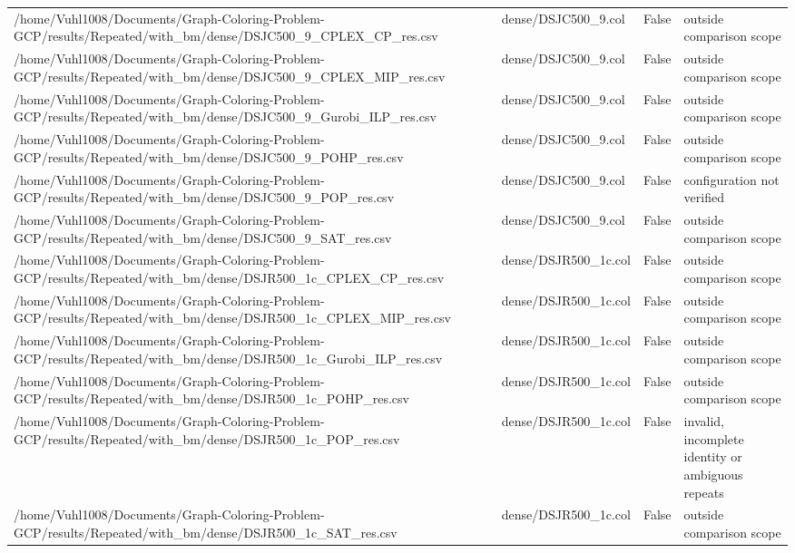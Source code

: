 \begin{table}[htbp]
\begin{tabular}{llll}
/home/Vuhl1008/Documents/Graph-Coloring-Problem-GCP/results/Repeated/with\_bm/dense/DSJC500\_9\_CPLEX\_CP\_res.csv & dense/DSJC500\_9.col & False & outside comparison scope \\
/home/Vuhl1008/Documents/Graph-Coloring-Problem-GCP/results/Repeated/with\_bm/dense/DSJC500\_9\_CPLEX\_MIP\_res.csv & dense/DSJC500\_9.col & False & outside comparison scope \\
/home/Vuhl1008/Documents/Graph-Coloring-Problem-GCP/results/Repeated/with\_bm/dense/DSJC500\_9\_Gurobi\_ILP\_res.csv & dense/DSJC500\_9.col & False & outside comparison scope \\
/home/Vuhl1008/Documents/Graph-Coloring-Problem-GCP/results/Repeated/with\_bm/dense/DSJC500\_9\_POHP\_res.csv & dense/DSJC500\_9.col & False & outside comparison scope \\
/home/Vuhl1008/Documents/Graph-Coloring-Problem-GCP/results/Repeated/with\_bm/dense/DSJC500\_9\_POP\_res.csv & dense/DSJC500\_9.col & False & configuration not verified \\
/home/Vuhl1008/Documents/Graph-Coloring-Problem-GCP/results/Repeated/with\_bm/dense/DSJC500\_9\_SAT\_res.csv & dense/DSJC500\_9.col & False & outside comparison scope \\
/home/Vuhl1008/Documents/Graph-Coloring-Problem-GCP/results/Repeated/with\_bm/dense/DSJR500\_1c\_CPLEX\_CP\_res.csv & dense/DSJR500\_1c.col & False & outside comparison scope \\
/home/Vuhl1008/Documents/Graph-Coloring-Problem-GCP/results/Repeated/with\_bm/dense/DSJR500\_1c\_CPLEX\_MIP\_res.csv & dense/DSJR500\_1c.col & False & outside comparison scope \\
/home/Vuhl1008/Documents/Graph-Coloring-Problem-GCP/results/Repeated/with\_bm/dense/DSJR500\_1c\_Gurobi\_ILP\_res.csv & dense/DSJR500\_1c.col & False & outside comparison scope \\
/home/Vuhl1008/Documents/Graph-Coloring-Problem-GCP/results/Repeated/with\_bm/dense/DSJR500\_1c\_POHP\_res.csv & dense/DSJR500\_1c.col & False & outside comparison scope \\
/home/Vuhl1008/Documents/Graph-Coloring-Problem-GCP/results/Repeated/with\_bm/dense/DSJR500\_1c\_POP\_res.csv & dense/DSJR500\_1c.col & False & invalid, incomplete identity or ambiguous repeats \\
/home/Vuhl1008/Documents/Graph-Coloring-Problem-GCP/results/Repeated/with\_bm/dense/DSJR500\_1c\_SAT\_res.csv & dense/DSJR500\_1c.col & False & outside comparison scope \\

\end{tabular}
\end{table}
